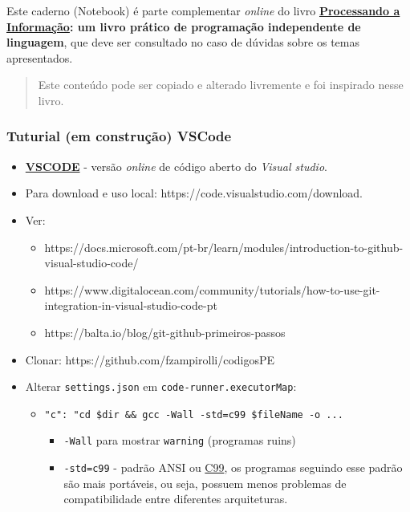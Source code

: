 \documentclass[12pt,a4paper]{article}
\providecommand{\tightlist}{%
      \setlength{\itemsep}{0pt}\setlength{\parskip}{0pt}}
\begin{document}
Este caderno (Notebook) é parte complementar \emph{online} do livro
\textbf{\href{https://editora.ufabc.edu.br/matematica-e-ciencias-da-computacao/58-processando-a-informacao}{Processando
a Informação}: um livro prático de programação independente de
linguagem}, que deve ser consultado no caso de dúvidas sobre os temas
apresentados.

\begin{quote}
Este conteúdo pode ser copiado e alterado livremente e foi inspirado
nesse livro.
\end{quote}

    \hypertarget{tuturial-em-construuxe7uxe3o-vscode}{%
\subsubsection{Tuturial (em construção)
VSCode}\label{tuturial-em-construuxe7uxe3o-vscode}}

    \begin{itemize}
\item
  \textbf{\href{https://vscode.dev}{VSCODE}} - versão \emph{online} de
  código aberto do \emph{Visual studio}.
\item
  Para download e uso local: https://code.visualstudio.com/download.
\item
  Ver:

  \begin{itemize}
  \tightlist
  \item
    https://docs.microsoft.com/pt-br/learn/modules/introduction-to-github-visual-studio-code/
  \item
    https://www.digitalocean.com/community/tutorials/how-to-use-git-integration-in-visual-studio-code-pt
  \item
    https://balta.io/blog/git-github-primeiros-passos
  \end{itemize}
\item
  Clonar: https://github.com/fzampirolli/codigosPE
\item
  Alterar \texttt{settings.json} em \texttt{code-runner.executorMap}:

  \begin{itemize}
  \tightlist
  \item
    \texttt{"c":\ "cd\ \$dir\ \&\&\ gcc\ -Wall\ -std=c99\ \$fileName\ -o\ ...}

    \begin{itemize}
    \tightlist
    \item
      \texttt{-Wall} para mostrar \texttt{warning} (programas ruins)
    \item
      \texttt{-std=c99} - padrão ANSI ou
      \href{https://en.m.wikipedia.org/wiki/C99}{C99}, os programas
      seguindo esse padrão são mais portáveis, ou seja, possuem menos
      problemas de compatibilidade entre diferentes arquiteturas.
    \end{itemize}
  \end{itemize}
\end{itemize}
\end{document}

